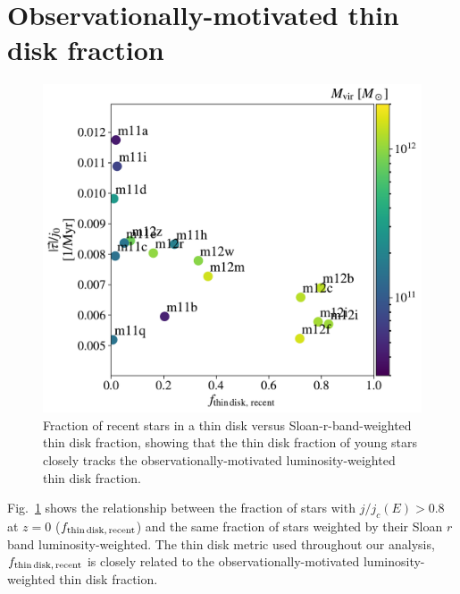 \documentclass[fleqn,usenatbib]{mnras}
\newcommand{\fthin}{f_{\rm thin\,disk,\,recent}}
\begin{document}


\appendix

\section{Observationally-motivated thin disk fraction}
\label{s: appendix-sloan thin disk fraction}

\begin{figure}
    \centering
    \includegraphics[width=\columnwidth]{figures/prevalence/thin_disk_v_thin_disk.pdf}
    \caption{
    Fraction of recent stars in a thin disk versus Sloan-r-band-weighted thin disk fraction, showing that the thin disk fraction of young stars closely tracks the observationally-motivated luminosity-weighted thin disk fraction.
    }
    \label{f: thin disk v thin disk}
\end{figure}

Fig.~\ref{f: thin disk v thin disk} shows the relationship between the fraction of stars with $j/j_c(E)>0.8$ at $z=0$ ($\fthin$) and the same fraction of stars weighted by their Sloan $r$ band luminosity-weighted.
The thin disk metric used throughout our analysis, $\fthin$ is closely related to the observationally-motivated luminosity-weighted thin disk fraction.
\end{document}
